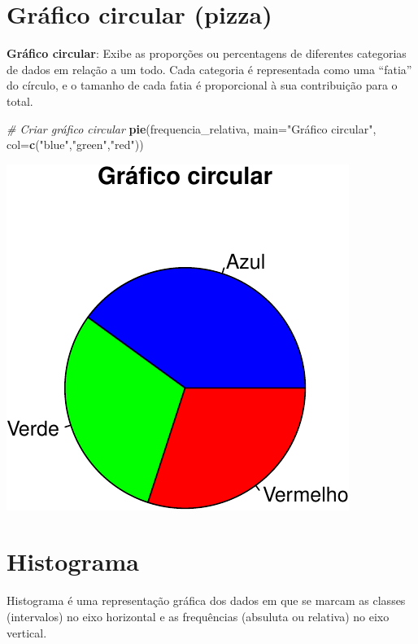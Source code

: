 \documentclass[
]{book}
\newenvironment{Shaded}{\begin{snugshade}}{\end{snugshade}}
\newcommand{\AttributeTok}[1]{\textcolor[rgb]{0.13,0.29,0.53}{#1}}
\newcommand{\CommentTok}[1]{\textcolor[rgb]{0.56,0.35,0.01}{\textit{#1}}}
\newcommand{\FunctionTok}[1]{\textcolor[rgb]{0.13,0.29,0.53}{\textbf{#1}}}
\newcommand{\NormalTok}[1]{#1}
\newcommand{\StringTok}[1]{\textcolor[rgb]{0.31,0.60,0.02}{#1}}
\theoremstyle{definition}
\theoremstyle{definition}
\theoremstyle{definition}
\theoremstyle{definition}
\theoremstyle{remark}
\begin{document}
\section{Gráfico circular (pizza)}\label{gruxe1fico-circular-pizza}

\textbf{Gráfico circular}: Exibe as proporções ou percentagens de diferentes categorias de dados em relação a um todo. Cada categoria é representada como uma ``fatia'' do círculo, e o tamanho de cada fatia é proporcional à sua contribuição para o total.

\begin{Shaded}
\begin{Highlighting}[]
\CommentTok{\# Criar gráfico circular}
\FunctionTok{pie}\NormalTok{(frequencia\_relativa, }\AttributeTok{main=}\StringTok{"Gráfico circular"}\NormalTok{,}
  \AttributeTok{col=}\FunctionTok{c}\NormalTok{(}\StringTok{"blue"}\NormalTok{,}\StringTok{"green"}\NormalTok{,}\StringTok{"red"}\NormalTok{))}
\end{Highlighting}
\end{Shaded}

\includegraphics{meuLivro2_files/figure-latex/unnamed-chunk-101-1.pdf}

\section{Histograma}\label{histograma}

Histograma é uma representação gráfica dos dados em que se marcam as classes (intervalos) no eixo horizontal e as frequências (absuluta ou relativa) no eixo vertical.
\end{document}

